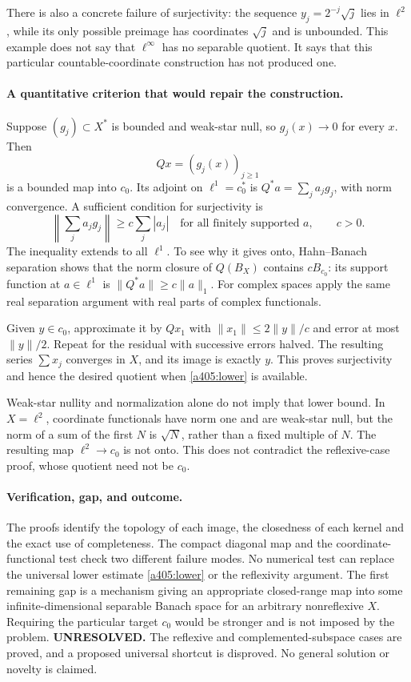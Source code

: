 \documentclass[11pt]{article}
\begin{document}
There is also a concrete failure of surjectivity: the sequence
$y_j=2^{-j}\sqrt j$ lies in $\ell^2$, while its only possible
preimage has coordinates $\sqrt j$ and is unbounded. This example
does not say that $\ell^\infty$ has no separable quotient. It says
that this particular countable-coordinate construction has not
produced one.

\paragraph{A quantitative criterion that would repair the construction.}
Suppose $(g_j)\subset X^*$ is bounded and weak-star null, so
$g_j(x)\to0$ for every $x$. Then
\[
 Qx=(g_j(x))_{j\geq1}
\]
is a bounded map into $c_0$. Its adjoint on $\ell^1=c_0^*$ is
$Q^*a=\sum_j a_jg_j$, with norm convergence. A sufficient condition
for surjectivity is
\begin{equation}\label{a405:lower}
 \left\|\sum_j a_jg_j\right\|\geq c\sum_j|a_j|
 \quad\text{for all finitely supported }a,\qquad c>0.
\end{equation}
The inequality extends to all $\ell^1$. To see why it gives onto,
Hahn--Banach separation shows that the norm closure of $Q(B_X)$
contains $cB_{c_0}$: its support function at $a\in\ell^1$ is
$\|Q^*a\|\geq c\|a\|_1$. For complex spaces apply the same real
separation argument with real parts of complex functionals.

Given $y\in c_0$, approximate it by $Qx_1$ with
$\|x_1\|\leq2\|y\|/c$ and error at most $\|y\|/2$.
Repeat for the residual with successive errors halved.
The resulting series $\sum x_j$ converges in $X$, and its image
is exactly $y$. This proves surjectivity and hence the desired
quotient when \eqref{a405:lower} is available.

Weak-star nullity and normalization alone do not imply that lower
bound. In $X=\ell^2$, coordinate functionals have norm one and are
weak-star null, but the norm of a sum of the first $N$ is
$\sqrt N$, rather than a fixed multiple of $N$. The resulting
map $\ell^2\to c_0$ is not onto. This does not contradict the
reflexive-case proof, whose quotient need not be $c_0$.

\paragraph{Verification, gap, and outcome.}
The proofs identify the topology of each image, the closedness of
each kernel and the exact use of completeness. The compact diagonal
map and the coordinate-functional test check two different failure
modes. No numerical test can replace the universal lower estimate
\eqref{a405:lower} or the reflexivity argument. The first remaining
gap is a mechanism giving an appropriate closed-range map into some
infinite-dimensional separable Banach space for an arbitrary
nonreflexive $X$. Requiring the particular target $c_0$ would be
stronger and is not imposed by the problem.
\textbf{UNRESOLVED.} The reflexive and complemented-subspace cases
are proved, and a proposed universal shortcut is disproved.
No general solution or novelty is claimed.
\end{document}
